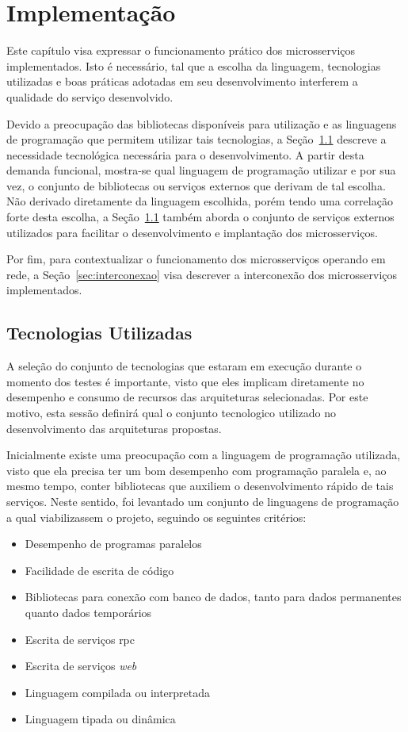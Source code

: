 \chapter{Implementação}
\label{cap5}

Este capítulo visa expressar o funcionamento prático dos microsserviços implementados.
%
Isto é necessário, tal que a escolha da linguagem, tecnologias utilizadas e boas práticas adotadas em seu desenvolvimento interferem a qualidade do serviço desenvolvido.

Devido a preocupação das bibliotecas disponíveis para utilização e as linguagens de programação que permitem utilizar tais tecnologias,
a Seção~\ref{sec:tecnologias} descreve a necessidade tecnológica necessária para o desenvolvimento. A partir desta demanda funcional, mostra-se qual linguagem de programação utilizar e por sua vez, o conjunto de bibliotecas ou serviços externos que derivam de tal escolha.
%
Não derivado diretamente da linguagem escolhida, porém tendo uma correlação forte desta escolha, a Seção~\ref{sec:tecnologias} também aborda o conjunto de serviços externos utilizados para facilitar o desenvolvimento e implantação dos microsserviços.

Por fim, para contextualizar o funcionamento dos microsserviços operando em rede, a Seção~\ref{sec:interconexao} visa descrever a interconexão dos microsserviços implementados.

\section{Tecnologias Utilizadas}
\label{sec:tecnologias}

A seleção do conjunto de tecnologias que estaram em execução durante o momento dos testes é importante, visto que eles implicam diretamente no desempenho e consumo de recursos das arquiteturas selecionadas.
%
Por este motivo, esta sessão definirá qual o conjunto tecnologico utilizado no desenvolvimento das arquiteturas propostas.

Inicialmente existe uma preocupação com a linguagem de programação utilizada, visto que ela precisa ter um bom desempenho com programação paralela e, ao mesmo tempo, conter bibliotecas que auxiliem o desenvolvimento rápido de tais serviços.
%
Neste sentido, foi levantado um conjunto de linguagens de programação a qual viabilizassem o projeto, seguindo os seguintes critérios:

\begin{itemize}
  \item Desempenho de programas paralelos
  \item Facilidade de escrita de código
  \item Bibliotecas para conexão com banco de dados, tanto para dados permanentes quanto dados temporários
  \item Escrita de serviços \ac{rpc}
  \item Escrita de serviços \textit{web}
  \item Linguagem compilada ou interpretada
  \item Linguagem tipada ou dinâmica
\end{itemize}

